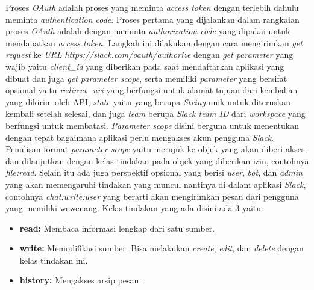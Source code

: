 Proses \textit{OAuth} adalah proses yang meminta \textit{access token} dengan terlebih dahulu meminta \textit{authentication code}. Proses pertama yang dijalankan dalam rangkaian proses \textit{OAuth} adalah dengan meminta \textit{authorization code} yang dipakai untuk mendapatkan \textit{access token}. Langkah ini dilakukan dengan cara mengirimkan \textit{get request} ke \textit{URL} \textit{https://slack.com/oauth/authorize} dengan \textit{get parameter} yang wajib yaitu \textit{client\_id} yang diberikan pada saat mendaftarkan aplikasi yang dibuat dan juga \textit{get parameter scope}, serta memiliki \textit{parameter} yang bersifat opsional yaitu \textit{redirect\_uri} yang berfungsi untuk alamat tujuan dari kembalian yang dikirim oleh API, \textit{state} yaitu yang berupa \textit{String} unik untuk diteruskan kembali setelah selesai, dan juga \textit{team} berupa \textit{Slack team ID} dari \textit{workspace} yang berfungsi untuk membatasi. \textit{Parameter} \textit{scope} disini berguna untuk menentukan dengan tepat bagaimana aplikasi perlu mengakses akun pengguna \textit{Slack}. Penulisan format \textit{parameter scope} yaitu merujuk ke objek yang akan diberi akses, dan dilanjutkan dengan kelas tindakan pada objek yang diberikan izin, contohnya \textit{file:read}. Selain itu ada juga perspektif opsional yang berisi \textit{user}, \textit{bot}, dan \textit{admin} yang akan memengaruhi tindakan yang muncul nantinya di dalam aplikasi \textit{Slack}, contohnya \textit{chat:write:user} yang berarti akan mengirimkan pesan dari pengguna yang memiliki wewenang. Kelas tindakan yang ada disini ada 3 yaitu:
\begin{itemize}
	\item \textbf{read:} Membaca informasi lengkap dari satu sumber. 
	\item \textbf{write:} Memodifikasi sumber. Bisa melakukan \textit{create}, \textit{edit}, dan \textit{delete} dengan kelas tindakan ini. 
	\item \textbf{history:} Mengakses arsip pesan. 
\end{itemize} 

